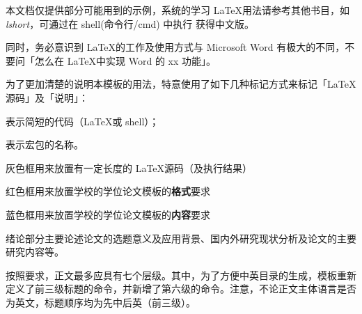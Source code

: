 


本文档仅提供部分可能用到的示例，系统的学习 \LaTeX 用法请参考其他书目，如 \emph{lshort}，可通过在 shell(命令行/cmd) 中执行  获得中文版。

同时，务必意识到 \LaTeX 的工作及使用方式与 Microsoft Word 有极大的不同，不要问「怎么在 \LaTeX 中实现 Word 的 xx 功能」。


为了更加清楚的说明本模板的用法，特意使用了如下几种标记方式来标记「\LaTeX 源码」及「说明」：

表示简短的代码（\LaTeX 或 shell）；

表示宏包的名称。

\begin{tcolorbox}
  灰色框用来放置有一定长度的 \LaTeX 源码（及执行结果）
\end{tcolorbox}

\begin{tcolorbox}[colback=red!5!white,colframe=red!75!black]
  红色框用来放置学校的学位论文模板的\textbf{格式}要求
\end{tcolorbox}

\begin{tcolorbox}[colback=blue!5!white,colframe=blue!75!black]
  蓝色框用来放置学校的学位论文模板的\textbf{内容}要求
\end{tcolorbox}

\begin{tcolorbox}[colback=blue!5!white,colframe=blue!75!black,title=绪论部分的要求]
  绪论部分主要论述论文的选题意义及应用背景、国内外研究现状分析及论文的主要研究内容等。
\end{tcolorbox}

\clearpage



按照要求，正文最多应具有七个层级。其中，为了方便中英目录的生成，模板重新定义了前三级标题的命令，并新增了第六级的命令。注意，不论正文主体语言是否为英文，标题顺序均为先中后英（前三级）。

